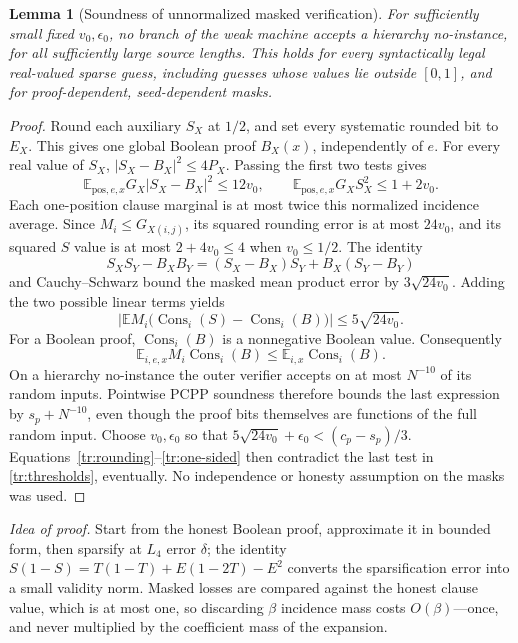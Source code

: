 \documentclass[11pt,letterpaper]{article}
\newtheorem{lemma}[theorem]{Lemma}
\theoremstyle{definition}
\theoremstyle{remark}
\begin{document}
\begin{lemma}[Soundness of unnormalized masked verification]
\label{tr:soundness}
For sufficiently small fixed $v_0,\epsilon_0$, no branch of the weak
machine accepts a hierarchy no-instance, for all sufficiently large
source lengths. This holds for every syntactically legal real-valued
sparse guess, including guesses whose values lie outside $[0,1]$,
and for proof-dependent, seed-dependent masks.
\end{lemma}
\begin{proof}
Round each auxiliary $S_X$ at $1/2$, and set every systematic rounded
bit to $E_X$. This gives one global Boolean proof $B_X(x)$, independently
of $e$. For every real value of $S_X$,
$|S_X-B_X|^2\le4P_X$. Passing the first two tests gives
\[
 \mathbb E_{\mathrm{pos},e,x}G_X|S_X-B_X|^2\le12v_0,
 \qquad
 \mathbb E_{\mathrm{pos},e,x}G_XS_X^2\le1+2v_0.
\]
Each one-position clause marginal is at most twice this normalized
incidence average. Since $M_i\le G_{X(i,j)}$, its squared rounding
error is at most $24v_0$, and its squared $S$ value is at most
$2+4v_0\le4$ when $v_0\le1/2$.
The identity
\[
 S_XS_Y-B_XB_Y=(S_X-B_X)S_Y+B_X(S_Y-B_Y)
\]
and Cauchy--Schwarz bound the masked mean product error by
$3\sqrt{24v_0}$. Adding the two possible linear terms yields
\begin{equation}
 \left|\mathbb E M_i\bigl(\operatorname{Cons}_i(S)
                  -\operatorname{Cons}_i(B)\bigr)\right|
 \le5\sqrt{24v_0}.
 \label{tr:rounding}
\end{equation}
For a Boolean proof, $\operatorname{Cons}_i(B)$ is a nonnegative
Boolean value. Consequently
\begin{equation}
 \mathbb E_{i,e,x}M_i\operatorname{Cons}_i(B)
 \le\mathbb E_{i,x}\operatorname{Cons}_i(B).
 \label{tr:one-sided}
\end{equation}
On a hierarchy no-instance the outer verifier accepts on at most
$N^{-10}$ of its random inputs. Pointwise PCPP soundness therefore
bounds the last expression by $s_p+N^{-10}$, even though the proof
bits themselves are functions of the full random input.
Choose $v_0,\epsilon_0$ so that
$5\sqrt{24v_0}+\epsilon_0<(c_p-s_p)/3$.
Equations~\eqref{tr:rounding}--\eqref{tr:one-sided} then contradict
the last test in \eqref{tr:thresholds}, eventually.
No independence or honesty assumption on the masks was used.
\end{proof}

\emph{Idea of proof.} Start from the honest Boolean proof,
approximate it in bounded form, then sparsify at $L_4$ error
$\delta$; the identity $S(1-S)=T(1-T)+E(1-2T)-E^2$ converts the
sparsification error into a small validity norm. Masked losses are
compared against the honest clause value, which is at most one, so
discarding $\beta$ incidence mass costs $O(\beta)$---once, and never
multiplied by the coefficient mass of the expansion.
\end{document}
